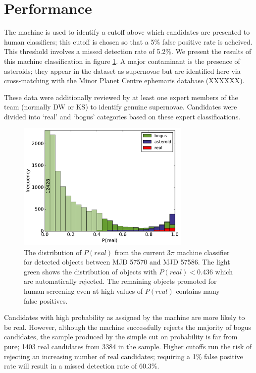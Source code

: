 \documentclass[a4paper,fleqn,usenatbib]{mnras}
\begin{document}
\section{Performance}

The machine is used to identify a cutoff above which candidates are presented to human classifiers; this cutoff is chosen so that a 5\% false positive rate is acheived. This threshold involves a missed detection rate of 5.2\%. We present the results of this machine classification in figure \ref{fig:machine_dist}. A major contaminant is the presence of asteroids; they appear in the dataset as supernovae but are identified here via cross-matching with the Minor Planet Centre ephemaris database (XXXXXX). 

These data were additionally reviewed by at least one expert members of the team (normally DW or KS) to identify genuine supernovae. Candidates were divided into `real' and `bogus' categories based on these expert classifications. 

\begin{figure}
   \includegraphics[width=84mm]{figs/machine_hist.pdf}
   \caption{The distribution of $P(real)$ from the current 3$\pi$ machine classifier 
            for detected objects between MJD 57570 and MJD 57586.  The light green shows the distribution of 
            objects with $P(real) < 0.436$ which are automatically rejected.  The remaining 
            objects promoted for human screening even at high values of $P(real)$ contains
            many false positives.} 
   \label{fig:machine_dist} 
\end{figure}

Candidates with high probability as assigned by the machine are more likely to be real. However, although the machine successfully rejects the majority of bogus candidates, the sample produced by the simple cut on probability is far from pure; 1403 real candidates from 3384 in the sample. Higher cutoffs run the risk of rejecting an increasing number of real candidates; requiring a 1\% false positive rate will result in a missed detection rate of 60.3\%. 
\end{document}
